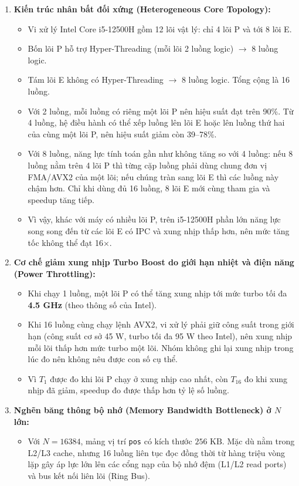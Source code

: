 \begin{enumerate}
\item \textbf{Kiến trúc nhân bất đối xứng (Heterogeneous Core Topology):}
\begin{itemize}
\item Vi xử lý Intel Core i5-12500H gồm 12 lõi vật lý: chỉ 4 lõi P và tới 8 lõi E.
\item Bốn lõi P hỗ trợ Hyper-Threading (mỗi lõi 2 luồng logic) $\rightarrow$ 8 luồng logic.
\item Tám lõi E không có Hyper-Threading $\rightarrow$ 8 luồng logic. Tổng cộng là 16 luồng.
\item Với 2 luồng, mỗi luồng có riêng một lõi P nên hiệu suất đạt trên 90\%. Từ 4 luồng, hệ điều hành có thể xếp luồng lên lõi E hoặc lên luồng thứ hai của cùng một lõi P, nên hiệu suất giảm còn 39--78\%.
\item Với 8 luồng, năng lực tính toán gần như không tăng so với 4 luồng: nếu 8 luồng nằm trên 4 lõi P thì từng cặp luồng phải dùng chung đơn vị FMA/AVX2 của một lõi; nếu chúng tràn sang lõi E thì các luồng này chậm hơn. Chỉ khi dùng đủ 16 luồng, 8 lõi E mới cùng tham gia và speedup tăng tiếp.
\item Vì vậy, khác với máy có nhiều lõi P, trên i5-12500H phần lớn năng lực song song đến từ các lõi E có IPC và xung nhịp thấp hơn, nên mức tăng tốc không thể đạt 16×.

\end{itemize}
\item \textbf{Cơ chế giảm xung nhịp Turbo Boost do giới hạn nhiệt và điện năng (Power Throttling):}
\begin{itemize}
\item Khi chạy 1 luồng, một lõi P có thể tăng xung nhịp tới mức turbo tối đa \textbf{4.5 GHz} (theo thông số của Intel).
\item Khi 16 luồng cùng chạy lệnh AVX2, vi xử lý phải giữ công suất trong giới hạn (công suất cơ sở 45 W, turbo tối đa 95 W theo Intel), nên xung nhịp mỗi lõi thấp hơn mức turbo một lõi. Nhóm không ghi lại xung nhịp trong lúc đo nên không nêu được con số cụ thể.
\item Vì $T_1$ được đo khi lõi P chạy ở xung nhịp cao nhất, còn $T_{16}$ đo khi xung nhịp đã giảm, speedup đo được thấp hơn tỷ lệ số luồng.

\end{itemize}
\item \textbf{Nghẽn băng thông bộ nhớ (Memory Bandwidth Bottleneck) ở $N$ lớn:}
\begin{itemize}
\item Với $N=16384$, mảng vị trí \texttt{pos} có kích thước $256\text{ KB}$. Mặc dù nằm trong L2/L3 cache, nhưng 16 luồng liên tục đọc đồng thời từ hàng triệu vòng lặp gây áp lực lớn lên các cổng nạp của bộ nhớ đệm (L1/L2 read ports) và bus kết nối liên lõi (Ring Bus).


\end{itemize}
\end{enumerate}
